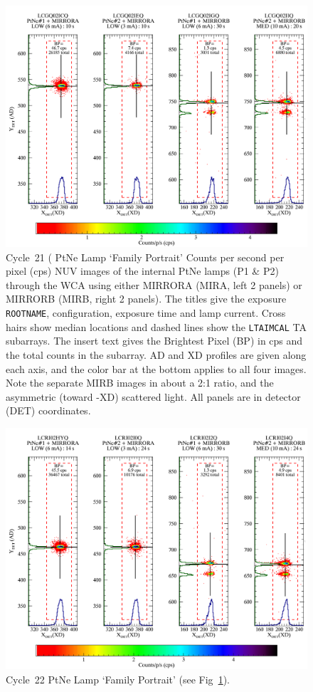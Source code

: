\begin{figure}[htb]
\noindent\includegraphics[width=0.9\linewidth]{png/C21_13526_FP.png}
\caption[C21 WCA Lamp `Family Portrait']{Cycle~21 ( PtNe Lamp `Family Portrait'
Counts per second per pixel (cps) NUV images of the internal PtNe lamps (P1 \& P2) through the
WCA using either MIRRORA (MIRA, left 2 panels) or MIRRORB (MIRB, right 2 panels). The titles
give the exposure \texttt{ROOTNAME}, configuration, exposure time and lamp current. Cross hairs show median locations and dashed
lines show the \texttt{LTAIMCAL} TA subarrays.
The insert text gives the Brightest Pixel (BP) in cps and the total counts in the subarray.
AD and XD profiles are given along each axis, and the color bar at the
bottom applies to all four images. Note the separate MIRB images in about a 2:1 ratio, and the asymmetric
(toward -XD) scattered light. All panels are in detector (DET) coordinates.\label{fig:FG21}}
\end{figure}

\begin{figure}[htb]
\noindent\includegraphics*[width=0.9\linewidth]{png/C22_13972_FP.png}
\caption[C22 WCA Lamp `Family Portrait']{Cycle~22 PtNe Lamp `Family Portrait' (see Fig~\ref{fig:FG21}). \label{fig:FG22}}
\end{figure}

